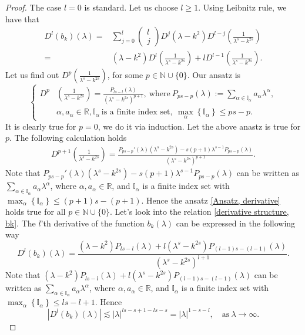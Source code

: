 \documentclass[12pt]{amsart}
\numberwithin{equation}{section}
\theoremstyle{definition}
\theoremstyle{remark}
\numberwithin{equation}{section}
\begin{document}
	\begin{proof}
		The case $l=0$ is standard. Let us choose $l\geq 1$. Using Leibnitz rule, we have that
		\begin{align}
			D^l (b_k)(\lambda)=& \sum_{j=0}^l \begin{pmatrix}
				l \\j   
			\end{pmatrix} D^j (\lambda-k^2) D^{l-j} \left(\frac{1}{\lambda^s-k^{2s}}\right) \nonumber\\
			=& (\lambda-k^2) D^{l} \left(\frac{1}{\lambda^s-k^{2s}}\right)+ l D^{l-1} \left(\frac{1}{\lambda^s-k^{2s}}\right). \label{derivative structure, bk}
		\end{align}
		Let us find out $\displaystyle{D^{p} \left(\frac{1}{\lambda^s-k^{2s}}\right)}$, for some $p\in\mathbb{N}\cup\{0\}$. Our ansatz is 
		\begin{equation}\label{Ansatz, derivative}
			\left \{
			\begin{aligned}
				D^{p} & \left(\frac{1}{\lambda^s-k^{2s}}\right)= \frac{P_{ls-l}(\lambda)}{(\lambda^s-k^{2s})^{p+1}}, \  \text{where}\ P_{ps-p}(\lambda):=\sum_{\alpha\in \mathbb{I}_{\alpha}} a_{\alpha}\lambda^{\alpha}, \\
				& \alpha, a_{\alpha}\in \mathbb{R}, \mathbb{I}_{\alpha} \ \text{is a finite index set},\ \max_{\alpha}\left\{\mathbb{I}_{\alpha}\right\}\leq ps-p.
			\end{aligned}
			\right. 
		\end{equation}
		It is clearly true for $p=0$, we do it via induction. Let the above anastz is true for $p$. The following calculation holds
		\begin{align*}
			D^{p+1} \left(\frac{1}{\lambda^s-k^{2s}}\right)= \frac{P_{ps-p}'(\lambda)(\lambda^s-k^{2s})-s(p+1)\lambda^{s-1}P_{ps-p}(\lambda)}{(\lambda^s-k^{2s})^{p+1}}.
		\end{align*}
		Note that $P_{ps-p}'(\lambda)(\lambda^s-k^{2s})-s(p+1)\lambda^{s-1}P_{ps-p}(\lambda)$ can be written as $\displaystyle{\sum_{\alpha\in \mathbb{I}_{\alpha}} a_{\alpha}\lambda^{\alpha}}$, where $\alpha,a_{\alpha}\in\mathbb{R}$, and  $\mathbb{I}_{\alpha}$ is a finite index set with $\displaystyle{\max_{\alpha}\left\{\mathbb{I}_{\alpha}\right\}\leq (p+1)s-(p+1)}$. Hence the ansatz \eqref{Ansatz, derivative} holds true for all $p\in\mathbb{N}\cup\{0\}$. Let's look into the relation \eqref{derivative structure, bk}. The $l$'th derivative  of the function $b_k(\lambda)$ can be expressed in the following way
		\[
		D^l(b_k)(\lambda)=\frac{(\lambda-k^2)P_{ls-l}(\lambda)+l(\lambda^s-k^{2s})P_{(l-1)s-(l-1)}(\lambda)}{(\lambda^s-k^{2s})^{l+1}}.
		\]
		Note that $\displaystyle{(\lambda-k^2)P_{ls-l}(\lambda)+l(\lambda^s-k^{2s})P_{(l-1)s-(l-1)}(\lambda)}$ can be written as $\displaystyle{\sum_{\alpha\in \mathbb{I}_{\alpha}} a_{\alpha}\lambda^{\alpha}}$, where $\alpha,a_{\alpha}\in\mathbb{R}$, and  $\mathbb{I}_{\alpha}$ is a finite index set with $\displaystyle{\max_{\alpha}\left\{\mathbb{I}_{\alpha}\right\}\leq ls-l+1}$. Hence
		\[
		\left | D^l(b_k)(\lambda)\right| \lesssim | \lambda|^{ls-s+1-ls-s}=|\lambda|^{1-s-l}, \quad \mbox{as}\ \lambda \to \infty.
		\]
	\end{proof}
\end{document}
